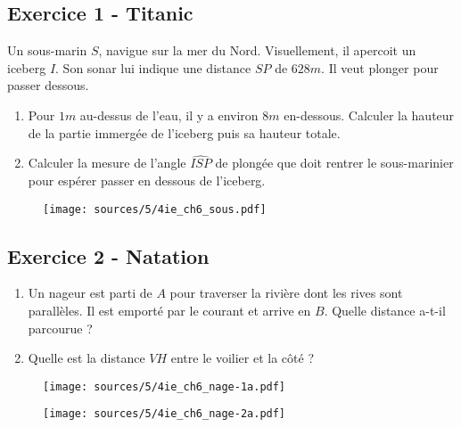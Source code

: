 \documentclass[10pt]{article}
\begin{document}
\subsection*{Exercice 1 - Titanic} 
\begin{multicols}{2}


  Un sous-marin $S$, navigue sur la mer du Nord. Visuellement, il apercoit un iceberg $I$. Son sonar lui indique une distance $SP$ de $628m$. Il veut plonger pour passer dessous.

  \begin{enumerate}
  \item[1.] Pour $1m$ au-dessus de l'eau, il y a environ $8m$ en-dessous. Calculer la hauteur de la partie immergée de l'iceberg puis sa hauteur totale.
  \item[2.] Calculer la mesure de l'angle $\widehat{ISP}$ de plongée que doit rentrer le sous-marinier pour espérer passer en dessous de l'iceberg.
  \end{enumerate}

  \begin{figure}[H]
    \centering
    \texttt{[image: sources/5/4ie\_ch6\_sous.pdf]}
  \end{figure}
\end{multicols}


\subsection*{Exercice 2 - Natation} 
\begin{multicols}{2}



  \begin{enumerate}
  \item[1.] Un nageur est parti de $A$ pour traverser la rivière dont les rives sont parallèles. Il est emporté par le courant et arrive en $B$. Quelle distance a-t-il parcourue ?

  \item[2.]Quelle est la distance $VH$ entre le voilier et la côté ?
  \end{enumerate}

  \begin{figure}[H]
    \centering
    \texttt{[image: sources/5/4ie\_ch6\_nage-1a.pdf]}
  \end{figure}

  \begin{figure}[H]
    \centering
    \texttt{[image: sources/5/4ie\_ch6\_nage-2a.pdf]}
  \end{figure}
\end{multicols}
\end{document}
